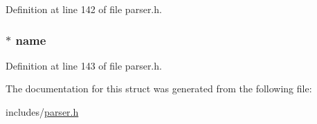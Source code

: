 Definition at line 142 of file parser.\+h.

\hypertarget{structfunction__prototype__ast__node_a0be25b04f38aae29e2dd7c1b72d4797c}{
\subsubsection[{name}]{$\ast$ name}}\label{structfunction__prototype__ast__node_a0be25b04f38aae29e2dd7c1b72d4797c}


Definition at line 143 of file parser.\+h.



The documentation for this struct was generated from the following file\+:\begin{DoxyCompactItemize}
\item 
includes/\hyperlink{parser_8h}{parser.\+h}\end{DoxyCompactItemize}

